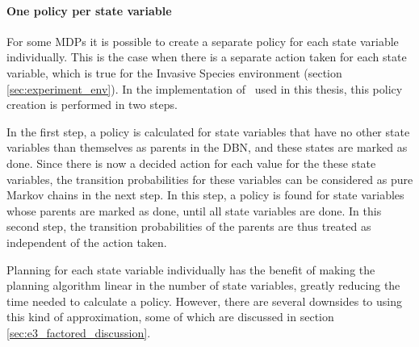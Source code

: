 \paragraph{One policy per state variable}
\label{sec:one_policy_per_state_variable}

For some MDPs it is possible to create a separate policy for each state
variable individually. This is the case when there is a separate action taken
for each state variable, which is true for the Invasive Species environment
(section \ref{sec:experiment_env}). In the implementation of \etre\ used in
this thesis, this policy creation is performed in two steps. 

In the first step, a policy is calculated for state variables that have no
other state variables than themselves as parents in the DBN, and these states
are marked as done. Since there is now a decided action for each value for the
these state variables, the transition probabilities for these variables can be
considered as pure Markov chains in the next step. In this step, a policy is found for state
variables whose parents are marked as done, until all state variables are done.
In this second step, the transition probabilities of the parents are thus
treated as independent of the action taken.

Planning for each state variable individually has the benefit of making the
planning algorithm linear in the number of state variables, greatly reducing
the time needed to calculate a policy. However, there are several downsides to
using this kind of approximation, some of which are discussed in section
\ref{sec:e3_factored_discussion}.
